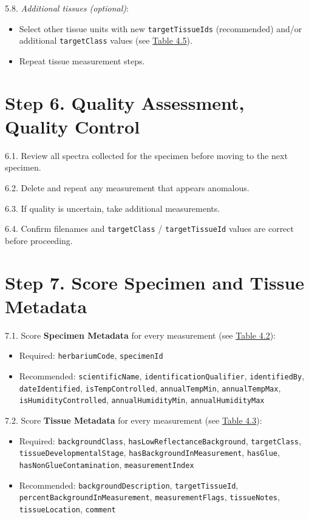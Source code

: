 \documentclass[
  letterpaper,
  DIV=11,
  numbers=noendperiod]{scrreprt}
\providecommand{\tightlist}{%
  \setlength{\itemsep}{0pt}\setlength{\parskip}{0pt}}
\begin{document}
5.8. \emph{Additional tissues (optional)}:

\begin{itemize}
\tightlist
\item
  Select other tissue units with new \texttt{targetTissueIds}
  (recommended) and/or additional \texttt{targetClass} values (see
  \hyperref[tbl-4-5]{Table 4.5}).
\item
  Repeat tissue measurement steps.
\end{itemize}

\section{Step 6. Quality Assessment, Quality
Control}\label{step-6.-quality-assessment-quality-control}

6.1. Review all spectra collected for the specimen before moving to the
next specimen.

6.2. Delete and repeat any measurement that appears anomalous.

6.3. If quality is uncertain, take additional measurements.

6.4. Confirm filenames and \texttt{targetClass} /
\texttt{targetTissueId} values are correct before proceeding.

\section{Step 7. Score Specimen and Tissue
Metadata}\label{step-7.-score-specimen-and-tissue-metadata}

7.1. Score \textbf{Specimen Metadata} for every measurement (see
\hyperref[tbl-4-2]{Table 4.2}):

\begin{itemize}
\tightlist
\item
  Required: \texttt{herbariumCode}, \texttt{specimenId}\\
\item
  Recommended: \texttt{scientificName},
  \texttt{identificationQualifier}, \texttt{identifiedBy},
  \texttt{dateIdentified}, \texttt{isTempControlled},
  \texttt{annualTempMin}, \texttt{annualTempMax},
  \texttt{isHumidityControlled}, \texttt{annualHumidityMin},
  \texttt{annualHumidityMax}
\end{itemize}

7.2. Score \textbf{Tissue Metadata} for every measurement (see
\hyperref[tbl-4-3]{Table 4.3}):

\begin{itemize}
\tightlist
\item
  Required: \texttt{backgroundClass},
  \texttt{hasLowReflectanceBackground}, \texttt{targetClass},
  \texttt{tissueDevelopmentalStage},
  \texttt{hasBackgroundInMeasurement}, \texttt{hasGlue},
  \texttt{hasNonGlueContamination}, \texttt{measurementIndex}\\
\item
  Recommended: \texttt{backgroundDescription}, \texttt{targetTissueId},
  \texttt{percentBackgroundInMeasurement}, \texttt{measurementFlags},
  \texttt{tissueNotes}, \texttt{tissueLocation}, \texttt{comment}
\end{itemize}
\end{document}
